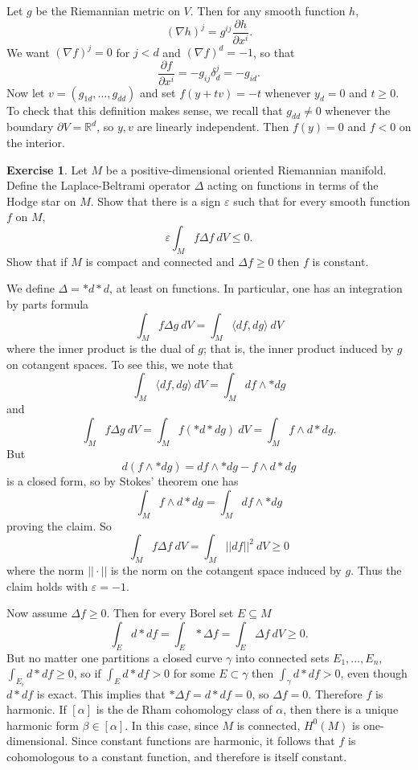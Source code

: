 \documentclass[10pt]{article}
\newcommand{\RR}{\mathbb{R}}
\renewcommand{\epsilon}{\varepsilon}
\theoremstyle{definition}
\newtheorem{exer}{Exercise}
\begin{document}
Let $g$ be the Riemannian metric on $V$. Then for any smooth function $h$,
$$(\nabla h)^j = g^{ij} \frac{\partial h}{\partial x^i}.$$
We want $(\nabla f)^j = 0$ for $j < d$ and $(\nabla f)^d = -1$, so that
$$\frac{\partial f}{\partial x^i} = -g_{ij} \delta^j_d = -g_{id}.$$
Now let $v = (g_{1d}, \dots, g_{dd})$ and set $f(y + tv) = -t$ whenever $y_d = 0$ and $t \geq 0$.
To check that this definition makes sense, we recall that $g_{dd} \neq 0$ whenever the boundary $\partial V = \RR^d$, so $y,v$ are linearly independent.
Then $f(y) = 0$ and $f < 0$ on the interior.

\begin{exer}
Let $M$ be a positive-dimensional oriented Riemannian manifold.
Define the Laplace-Beltrami operator $\Delta$ acting on functions in terms of the Hodge star on $M$.
Show that there is a sign $\epsilon$ such that for every smooth function $f$ on $M$,
$$\epsilon \int_M f \Delta f ~dV \leq 0.$$
Show that if $M$ is compact and connected and $\Delta f \geq 0$ then $f$ is constant.
\end{exer}

We define $\Delta = *d*d$, at least on functions.
In particular, one has an integration by parts formula
$$\int_M f \Delta g ~dV = \int_M \langle df, dg\rangle ~dV$$
where the inner product is the dual of $g$; that is, the inner product induced by $g$ on cotangent spaces.
To see this, we note that
$$\int_M \langle df, dg\rangle ~dV = \int_M df \wedge *dg$$
and
$$\int_M f \Delta g~dV = \int_M f(*d*dg) ~dV = \int_M f \wedge d*dg.$$
But
$$d(f \wedge *dg) = df \wedge *dg - f \wedge d*dg$$
is a closed form, so by Stokes' theorem one has
$$\int_M f \wedge d*dg = \int_M df \wedge *dg$$
proving the claim.
So
$$\int_M f \Delta f ~dV = \int_M ||df||^2 ~dV \geq 0$$
where the norm $||\cdot||$ is the norm on the cotangent space induced by $g$.
Thus the claim holds with $\epsilon = -1$.

Now assume $\Delta f \geq 0$. Then for every Borel set $E \subseteq M$
$$\int_E d*df = \int_E *\Delta f = \int_E \Delta f~dV \geq 0.$$
But no matter one partitions a closed curve $\gamma$ into connected sets $E_1, \dots, E_n$, $\int_{E_i} d*df \geq 0$, so if $\int_E d*df > 0$ for some $E \subset \gamma$ then $\int_\gamma d*df > 0$, even though $d*df$ is exact.
This implies that $*\Delta f = d*df = 0$, so $\Delta f = 0$.
Therefore $f$ is harmonic.
If $[\alpha]$ is the de Rham cohomology class of $\alpha$, then there is a unique harmonic form $\beta \in [\alpha]$.
In this case, since $M$ is connected, $H^0(M)$ is one-dimensional.
Since constant functions are harmonic, it follows that $f$ is cohomologous to a constant function, and therefore is itself constant.
\end{document}
